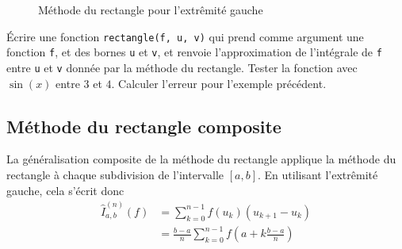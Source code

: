\begin{figure}[h!]
    \centering
    \caption{Méthode du rectangle pour l'extrêmité gauche}
    \label{fig:rectangle-method}
\end{figure}

\quessques Écrire une fonction \texttt{rectangle(f, u, v)} qui prend comme argument une fonction \texttt{f}, et des bornes \texttt{u} et \texttt{v}, et renvoie l'approximation de l'intégrale de \texttt{f} entre \texttt{u} et \texttt{v} donnée par la méthode du rectangle. 
\ssques Tester la fonction avec $ \sin(x) $ entre $ 3 $ et $ 4 $. 
\ssques Calculer l'erreur pour l'exemple précédent.


\subsection{Méthode du rectangle composite}

La généralisation composite de la méthode du rectangle applique la méthode du rectangle à chaque subdivision de l'intervalle $ [a, b] $. En utilisant l'extrêmité gauche, cela s'écrit donc
\begin{align*}
    \hat{I}^{(n)}_{a, b}(f) &= \sum_{k=0}^{n-1} f(u_k)(u_{k+1}-u_k)\\
                          &= \frac{b-a}{n}\sum_{k=0}^{n-1} f(a + k \frac{b-a}{n}) 
\end{align*}

